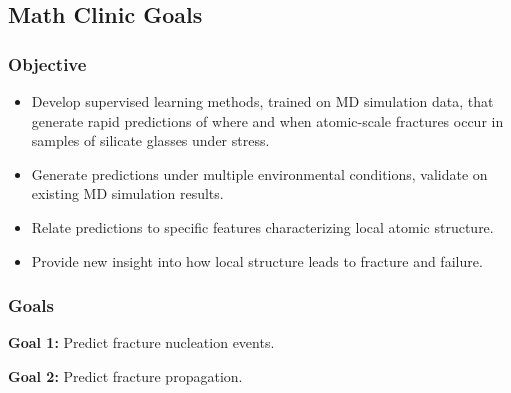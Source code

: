 




\subsection{Math Clinic Goals}
\frame
{\frametitle{Objective}
\begin{block}{}
\begin{itemize}
    \item Develop supervised learning methods, trained on MD simulation data, that generate rapid predictions of where and when atomic-scale fractures occur in samples of silicate glasses under stress. 

\item Generate predictions under multiple environmental conditions, validate on existing MD simulation results. 

\item Relate predictions to specific features characterizing local atomic structure.

\item Provide new insight into how local structure leads to fracture and failure.
\end{itemize}
\end{block}
}

\frame
{\frametitle{Goals}
\begin{block}{}

\textbf{Goal 1:} Predict fracture nucleation events.
\newline
\newline

\textbf{Goal 2:} Predict fracture propagation.

\end{block}
}